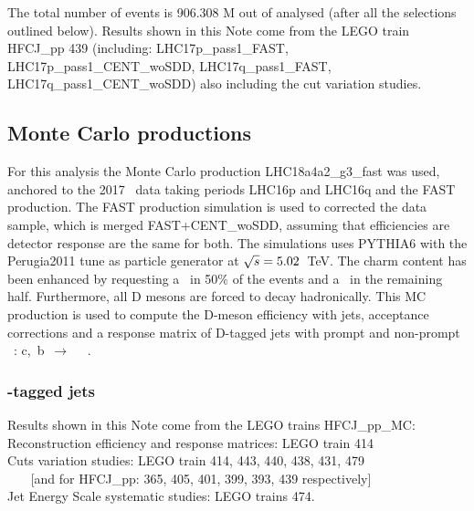 The total number of events is 906.308  M  out of  analysed (after all the selections outlined below).
Results shown in this Note come from the LEGO train HFCJ\_pp 439 (including: LHC17p\_pass1\_FAST, LHC17p\_pass1\_CENT\_woSDD, LHC17q\_pass1\_FAST, LHC17q\_pass1\_CENT\_woSDD) 
also including the cut variation studies.

\subsection{Monte Carlo productions}

For this analysis the Monte Carlo production LHC18a4a2\_g3\_fast was used, anchored to the 2017 \pp\ data taking periods LHC16p and LHC16q and the FAST production. The FAST production simulation is used to corrected the data sample, which is merged FAST+CENT\_woSDD, assuming that efficiencies are detector response are the same for both.
The simulations uses PYTHIA6 with the Perugia2011 tune as particle generator at $\sqrt{s}=5.02$~TeV.
The charm content has been enhanced by requesting a \ccbar\ in 50\% of the events and a \bbbar\ in the remaining half.
Furthermore, all D mesons are forced to decay hadronically.
This MC production is used to compute the D-meson efficiency with jets, acceptance corrections and a response matrix of D-tagged jets with prompt and non-prompt \Dzero\ : c,~b~$\rightarrow$ ~\Dzero\ .


\subsubsection{\Dzero-tagged jets}
Results shown in this Note come from the LEGO trains HFCJ\_pp\_MC:  
\\Reconstruction efficiency and response matrices: LEGO train {414}
\\Cuts variation studies: LEGO train {414, 443, 440, 438, 431, 479} 
\\  ~~~ [and for HFCJ\_pp: {365, 405, 401, 399, 393, 439} respectively]
\\Jet Energy Scale systematic studies: LEGO trains 474.




